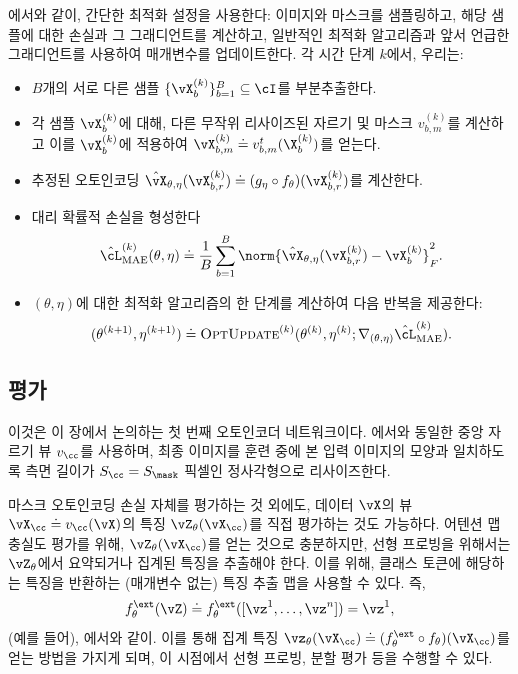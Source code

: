 \documentclass[../../book-main_ko.tex]{subfiles}
\begin{document}
에서와 같이, 간단한 최적화 설정을 사용한다: 이미지와 마스크를 샘플링하고, 해당 샘플에 대한 손실과 그 그래디언트를 계산하고, 일반적인 최적화 알고리즘과 앞서 언급한 그래디언트를 사용하여 매개변수를 업데이트한다. 각 시간 단계 \(k\)에서, 우리는:
\begin{itemize}
    \item \(B\)개의 서로 다른 샘플 \(\{\vX_{b}^{(k)}\}_{b = 1}^{B} \subseteq \cI\)를 부분추출한다.
    \item 각 샘플 \(\vX_{b}^{(k)}\)에 대해, 다른 무작위 리사이즈된 자르기 및 마스크 \(v_{b, m}^{(k)}\)를 계산하고 이를 \(\vX_{b}^{(k)}\)에 적용하여 \(\vX_{b, m}^{(k)} \doteq v_{b, m}^{t}(\X_{b}^{(k)})\)를 얻는다.
    \item 추정된 오토인코딩 \(\hat{\vX}_{\theta, \eta}(\vX_{b, r}^{(k)}) \doteq (g_{\eta} \circ f_{\theta})(\vX_{b, r}^{(k)})\)를 계산한다.
    \item 대리 확률적 손실을 형성한다
    \begin{equation}
        \hat{\cL}_{\mathrm{MAE}}^{(k)}(\theta, \eta) \doteq \frac{1}{B}\sum_{b = 1}^{B}\norm{\hat{\vX}_{\theta, \eta}(\vX_{b, r}^{(k)}) - \vX_{b}^{(k)}}_{F}^{2}.
    \end{equation}
    \item \((\theta, \eta)\)에 대한 최적화 알고리즘의 한 단계를 계산하여 다음 반복을 제공한다:
    \begin{equation}
        (\theta^{(k + 1)}, \eta^{(k + 1)}) \doteq \textsc{OptUpdate}^{(k)}(\theta^{(k)}, \eta^{(k)}; \nabla_{(\theta, \eta)}\hat{\cL}_{\mathrm{MAE}}^{(k)}).
    \end{equation}
\end{itemize}

\subsection{평가} \label{sub:image_completion_optimization_1}

이것은 이 장에서 논의하는 첫 번째 오토인코더 네트워크이다. 에서와 동일한 중앙 자르기 뷰 \(v_{\cc}\)를 사용하며, 최종 이미지를 훈련 중에 본 입력 이미지의 모양과 일치하도록 측면 길이가 \(S_{\cc} = S_{\mask}\) 픽셀인 정사각형으로 리사이즈한다.

마스크 오토인코딩 손실 자체를 평가하는 것 외에도, 데이터 \(\vX\)의 뷰 \(\vX_{\cc} \doteq v_{\cc}(\vX)\)의 특징 \(\vZ_{\theta}(\vX_{\cc})\)를 직접 평가하는 것도 가능하다. 어텐션 맵 충실도 평가를 위해, \(\vZ_{\theta}(\vX_{\cc})\)를 얻는 것으로 충분하지만, 선형 프로빙을 위해서는 \(\vZ_{\theta}\)에서 요약되거나 집계된 특징을 추출해야 한다. 이를 위해, 클래스 토큰에 해당하는 특징을 반환하는 (매개변수 없는) 특징 추출 맵을 사용할 수 있다. 즉,
\begin{equation}
    f_{\theta}^{\ext}(\vZ) \doteq f_{\theta}^{\ext}( [\vz^{1}, \dots, \vz^{n}]) = \vz^{1},
\end{equation}
(예를 들어), 에서와 같이. 이를 통해 집계 특징 \(\vz_{\theta}(\vX_{\cc}) \doteq (f_{\theta}^{\ext} \circ f_{\theta})(\vX_{\cc})\)를 얻는 방법을 가지게 되며, 이 시점에서 선형 프로빙, 분할 평가 등을 수행할 수 있다.
\end{document}
